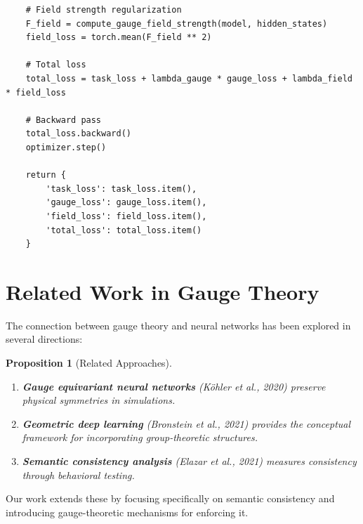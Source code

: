 \documentclass[12pt,letterpaper,twoside]{article}
\newtheorem{prop}{Proposition}[section]
\begin{document}
\begin{verbatim}
    # Field strength regularization
    F_field = compute_gauge_field_strength(model, hidden_states)
    field_loss = torch.mean(F_field ** 2)
    
    # Total loss
    total_loss = task_loss + lambda_gauge * gauge_loss + lambda_field * field_loss
    
    # Backward pass
    total_loss.backward()
    optimizer.step()
    
    return {
        'task_loss': task_loss.item(),
        'gauge_loss': gauge_loss.item(),
        'field_loss': field_loss.item(),
        'total_loss': total_loss.item()
    }
\end{verbatim}

\section{Related Work in Gauge Theory}

The connection between gauge theory and neural networks has been explored in several directions:

\begin{prop}[Related Approaches]
\begin{enumerate}
\item \textbf{Gauge equivariant neural networks} (Köhler et al., 2020) preserve physical symmetries in simulations.
\item \textbf{Geometric deep learning} (Bronstein et al., 2021) provides the conceptual framework for incorporating group-theoretic structures.
\item \textbf{Semantic consistency analysis} (Elazar et al., 2021) measures consistency through behavioral testing.
\end{enumerate}
\end{prop}

Our work extends these by focusing specifically on semantic consistency and introducing gauge-theoretic mechanisms for enforcing it.
\end{document}
